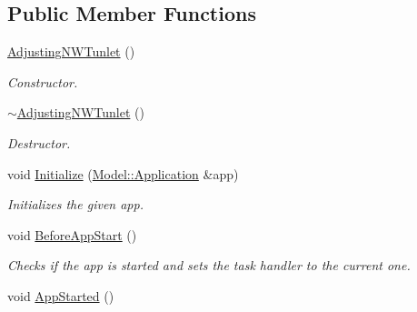 \subsection*{Public Member Functions}
\begin{DoxyCompactItemize}
\item 
\hypertarget{class_adjusting_n_w_tunlet_a8429c48adb69204d6c5c7f8968637e27}{\hyperlink{class_adjusting_n_w_tunlet_a8429c48adb69204d6c5c7f8968637e27}{Adjusting\-N\-W\-Tunlet} ()}\label{class_adjusting_n_w_tunlet_a8429c48adb69204d6c5c7f8968637e27}

\begin{DoxyCompactList}\small\item\em Constructor. \end{DoxyCompactList}\item 
\hypertarget{class_adjusting_n_w_tunlet_aa00265880edabed6a7bab6436a4dcc5d}{\hyperlink{class_adjusting_n_w_tunlet_aa00265880edabed6a7bab6436a4dcc5d}{$\sim$\-Adjusting\-N\-W\-Tunlet} ()}\label{class_adjusting_n_w_tunlet_aa00265880edabed6a7bab6436a4dcc5d}

\begin{DoxyCompactList}\small\item\em Destructor. \end{DoxyCompactList}\item 
void \hyperlink{class_adjusting_n_w_tunlet_a4f75a1810a225f7fe3038188c5089d1d}{Initialize} (\hyperlink{class_model_1_1_application}{Model\-::\-Application} \&app)
\begin{DoxyCompactList}\small\item\em Initializes the given app. \end{DoxyCompactList}\item 
\hypertarget{class_adjusting_n_w_tunlet_a4f357cf28da828f4fad6dd45337336c7}{void \hyperlink{class_adjusting_n_w_tunlet_a4f357cf28da828f4fad6dd45337336c7}{Before\-App\-Start} ()}\label{class_adjusting_n_w_tunlet_a4f357cf28da828f4fad6dd45337336c7}

\begin{DoxyCompactList}\small\item\em Checks if the app is started and sets the task handler to the current one. \end{DoxyCompactList}\item 
\hypertarget{class_adjusting_n_w_tunlet_afcb5be039949649915dcb2e056f11e2c}{void \hyperlink{class_adjusting_n_w_tunlet_afcb5be039949649915dcb2e056f11e2c}{App\-Started} ()}\label{class_adjusting_n_w_tunlet_afcb5be039949649915dcb2e056f11e2c}


\end{DoxyCompactItemize}
